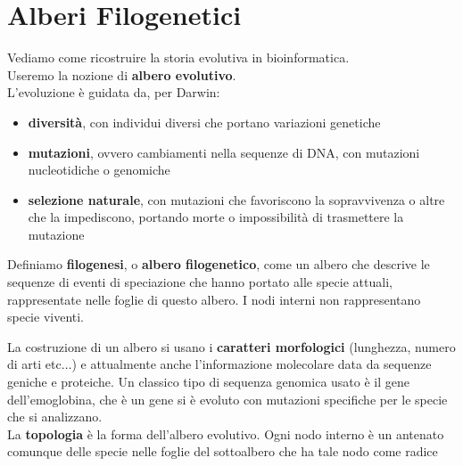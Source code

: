\documentclass[a4paper,12pt, oneside]{book}
\begin{document}
\chapter{Alberi Filogenetici}
Vediamo come ricostruire la storia evolutiva in bioinformatica.\\
Useremo la nozione di \textbf{albero evolutivo}.\\
L'evoluzione è guidata da, per Darwin:
\begin{itemize}
  \item \textbf{diversità}, con individui diversi che portano variazioni
  genetiche
  \item \textbf{mutazioni}, ovvero cambiamenti nella sequenze di DNA, con
  mutazioni nucleotidiche o genomiche
  \item \textbf{selezione naturale}, con mutazioni che favoriscono la
  sopravvivenza o altre che la impediscono, portando morte o impossibilità di
  trasmettere la mutazione
\end{itemize}
\begin{definizione}
  Definiamo \textbf{filogenesi}, o \textbf{albero filogenetico}, come un albero
  che descrive le sequenze di eventi di speciazione che hanno portato alle
  specie attuali, rappresentate nelle foglie di questo albero. I nodi interni
  non rappresentano specie viventi.
\end{definizione}
La costruzione di un albero si usano i \textbf{caratteri morfologici}
(lunghezza, numero di arti etc$\ldots$) e attualmente anche l'informazione
molecolare data da sequenze geniche e proteiche. Un classico tipo di sequenza
genomica usato è il gene dell'emoglobina, che è un gene si è evoluto con
mutazioni specifiche per le specie che si analizzano. \\

La \textbf{topologia} è la forma dell'albero evolutivo. Ogni nodo interno è
un antenato comunque delle specie nelle foglie del sottoalbero che ha tale
nodo come radice
\end{document}
